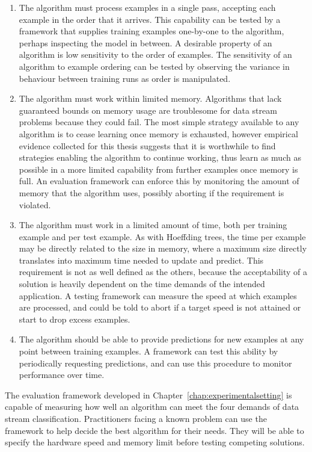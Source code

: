 \begin{enumerate}
\item The algorithm must process examples in a single pass, accepting each example in the order that it arrives. This capability can be tested by a framework that supplies training examples one-by-one to the algorithm, perhaps inspecting the model in between. A desirable property of an algorithm is low sensitivity to the order of examples. The sensitivity of an algorithm to example ordering can be tested by observing the variance in behaviour between training runs as order is manipulated.
\item The algorithm must work within limited memory. Algorithms that lack guaranteed bounds on memory usage are troublesome for data stream problems because they could fail. The most simple strategy available to any algorithm is to cease learning once memory is exhausted, however empirical evidence collected for this thesis suggests that it is worthwhile to find strategies enabling the algorithm to continue working, thus learn as much as possible in a more limited capability from further examples once memory is full. An evaluation framework can enforce this by monitoring the amount of memory that the algorithm uses, possibly aborting if the requirement is violated.
\item The algorithm must work in a limited amount of time, both per training example and per test example. As with Hoeffding trees, the time per example may be directly related to the size in memory, where a maximum size directly translates into maximum time needed to update and predict. This requirement is not as well defined as the others, because the acceptability of a solution is heavily dependent on the time demands of the intended application. A testing framework can measure the speed at which examples are processed, and could be told to abort if a target speed is not attained or start to drop excess examples.
\item The algorithm should be able to provide predictions for new examples at any point between training examples. A framework can test this ability by periodically requesting predictions, and can use this procedure to monitor performance over time.
\end{enumerate}

The evaluation framework developed in Chapter~\ref{chap:experimentalsetting} is capable of measuring how well an algorithm can meet the four demands of data stream classification. Practitioners facing a known problem can use the framework to help decide the best algorithm for their needs. They will be able to specify the hardware speed and memory limit before testing competing solutions.

